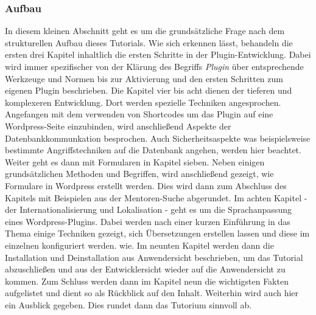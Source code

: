 \subsubsection{Aufbau}
In diesem kleinen Abschnitt geht es um die grundsätzliche Frage nach dem strukturellen Aufbau dieses Tutorials. \newline
Wie sich erkennen lässt, behandeln die ersten drei Kapitel inhaltlich die ersten Schritte in der Plugin-Entwicklung.  Dabei wird immer spezifischer von der Klärung des Begriffs \emph{Plugin} über entsprechende Werkzeuge und Normen bis zur Aktivierung und den ersten Schritten zum eigenen Plugin beschrieben. \newline
Die Kapitel vier bis acht dienen der tieferen und komplexeren Entwicklung. Dort werden spezielle Techniken angesprochen. Angefangen mit dem verwenden von Shortcodes um das Plugin auf eine Wordpress-Seite einzubinden, wird anschließend Aspekte der Datenbankkommunkation besprochen. Auch Sicherheitsaspekte was beispielsweise bestimmte Angriffstechniken auf die Datenbank angehen, werden hier beachtet. \newline
Weiter geht es dann mit Formularen in Kapitel sieben. Neben einigen grundsätzlichen Methoden und Begriffen, wird anschließend gezeigt, wie Formulare in Wordpress erstellt werden. Dies wird dann zum Abschluss des Kapitels mit Beispielen aus der Mentoren-Suche abgerundet.\newline
Im achten Kapitel - der Internationalisierung und Lokalisation - geht es um die Sprachanpassung eines Wordpress-Plugins. Dabei werden nach einer kurzen Einführung in das Thema einige Techniken gezeigt, sich Übersetzungen erstellen lassen und diese im einzelnen konfiguriert werden. wie.\newline
Im neunten Kapitel werden dann die Installation und Deinstallation aus Anwendersicht beschrieben, um das Tutorial abzuschließen und aus der Entwicklersicht wieder auf die Anwendersicht zu kommen. \newline
Zum Schluss werden dann im Kapitel neun die wichtigsten Fakten aufgelistet und dient so als Rückblick auf den Inhalt. Weiterhin wird auch hier ein Ausblick gegeben. Dies rundet dann das Tutorium sinnvoll ab.